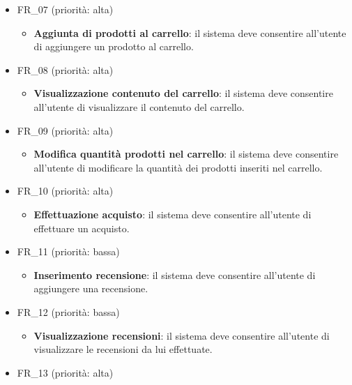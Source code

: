 \documentclass[12pt, a4paper, oneside]{book}
\begin{document}
\begin{itemize}
\begin{itemize}
                \end{itemize}
            \item FR\_07 (priorità: alta)
               \begin{itemize}
                   \item \textbf{Aggiunta di prodotti al carrello}: il sistema deve consentire all'utente di aggiungere un prodotto al carrello.
                \end{itemize}
            \newpage
            \item FR\_08 (priorità: alta)
               \begin{itemize}
                   \item \textbf{Visualizzazione contenuto del carrello}: il sistema deve consentire all'utente di visualizzare il contenuto del carrello.
                \end{itemize}
            \item FR\_09 (priorità: alta)
               \begin{itemize}
                   \item \textbf{Modifica quantità prodotti nel carrello}: il sistema deve consentire all'utente di modificare la quantità dei prodotti inseriti nel carrello.
                \end{itemize}
            \item FR\_10 (priorità: alta)
               \begin{itemize}
                   \item \textbf{Effettuazione acquisto}: il sistema deve consentire all'utente di effettuare un acquisto.
                \end{itemize}
            \item FR\_11 (priorità: bassa)
               \begin{itemize}
                   \item \textbf{Inserimento recensione}: il sistema deve consentire all'utente di aggiungere una recensione.
                \end{itemize}
            \item FR\_12 (priorità: bassa)
               \begin{itemize}
                   \item \textbf{Visualizzazione recensioni}: il sistema deve consentire all'utente di visualizzare le recensioni da lui effettuate.
                \end{itemize}
            \item FR\_13 (priorità: alta)

\end{itemize}
\end{document}
